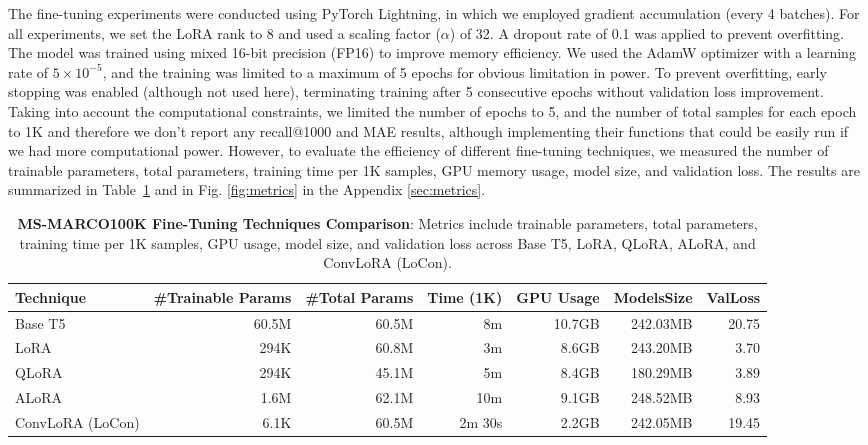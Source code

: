 The fine-tuning experiments were conducted using PyTorch Lightning, in which we employed gradient accumulation (every 4 batches). For all experiments, we set the LoRA rank to 8 and used a scaling factor (\(\alpha\)) of 32. A dropout rate of 0.1 was applied to prevent overfitting. The model was trained using mixed 16-bit precision (FP16) to improve memory efficiency. We used the AdamW optimizer with a learning rate of \(5 \times 10^{-5}\), and the training was limited to a maximum of 5 epochs for obvious limitation in power. To prevent overfitting, early stopping was enabled (although not used here), terminating training after 5 consecutive epochs without validation loss improvement. Taking into account the computational constraints, we limited the number of epochs to 5, and the number of total samples for each epoch to 1K and therefore we don't report any recall@1000 and MAE results, although implementing their functions that could be easily run if we had more computational power. However, to evaluate the efficiency of different fine-tuning techniques, we measured the number of trainable parameters, total parameters, training time per 1K samples, GPU memory usage, model size, and validation loss. The results are summarized in Table~\ref{tab:results_comparison} and in Fig. \ref{fig:metrics} in the Appendix \ref{sec:metrics}.

\begin{table}[ht]
    \centering
    \small
    \begin{tabular}{l|rrrrrr}
    \toprule
    \textbf{Technique} & \textbf{\#Trainable Params} & \textbf{\#Total Params} & \textbf{Time (1K)} & \textbf{GPU Usage} & \textbf{ModelsSize} & \textbf{ValLoss} \\
    \midrule
    Base T5         & 60.5M & 60.5M & 8m & 10.7GB & 242.03MB & 20.75\\
    LoRA            & 294K & 60.8M & 3m & 8.6GB & 243.20MB & 3.70\\
    QLoRA           & 294K & 45.1M & 5m & 8.4GB & 180.29MB & 3.89\\
    ALoRA           & 1.6M & 62.1M & 10m & 9.1GB & 248.52MB & 8.93\\
    ConvLoRA (LoCon)& 6.1K & 60.5M & 2m 30s & 2.2GB & 242.05MB & 19.45\\
    \bottomrule
    \end{tabular}
    \caption{\textbf{MS-MARCO100K Fine-Tuning Techniques Comparison}: Metrics include trainable parameters, total parameters, training time per 1K samples, GPU usage, model size, and validation loss across Base T5, LoRA, QLoRA, ALoRA, and ConvLoRA (LoCon).}
    \label{tab:results_comparison}
\end{table}

